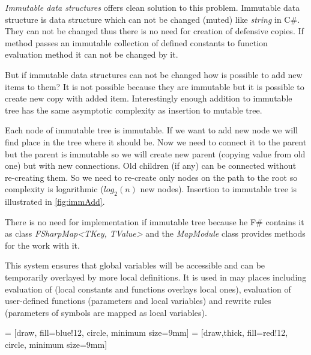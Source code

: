 \emph{Immutable data structures} offers clean solution to this problem.
Immutable data structure is data structure which can not be changed (muted) like \emph{string} in C\#.
They can not be changed thus there is no need for creation of defensive copies.
If method passes an immutable collection of defined constants to function evaluation method it can not be changed by it.

But if immutable data structures can not be changed how is possible to add new items to them?
It is not possible because they are immutable but it is possible to create new copy with added item.
Interestingly enough addition to immutable tree has the same asymptotic complexity as insertion to mutable tree.

Each node of immutable tree is immutable.
If we want to add new node we will find place in the tree where it should be.
Now we need to connect it to the parent but the parent is immutable so we will create new parent (copying value from old one) but with new connections.
Old children (if any) can be connected without re-creating them.
So we need to re-create only nodes on the path to the root so complexity is logarithmic ($log_2(n)$ new nodes).
Insertion to immutable tree is illustrated in \autoref{fig:immAdd}.

There is no need for implementation if immutable tree because he F\# contains it as class \emph{FSharpMap<TKey, TValue>} and the \emph{MapModule} class provides methods for the work with it.

This system ensures that global variables will be accessible and can be temporarily overlayed by more local definitions.
It is used in may places including evaluation of \lsystems (local constants and functions overlays local ones), evaluation of user-defined functions (parameters and local variables)
	and rewrite rules (parameters of symbols are mapped as local variables).
	


 = [draw, fill=blue!12, circle, minimum size=9mm]
 = [draw,thick, fill=red!12, circle, minimum size=9mm]

